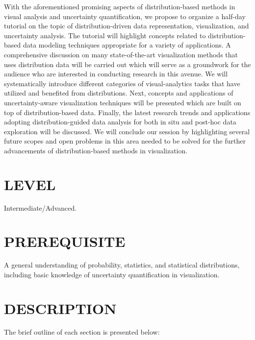 \documentclass[preprint,journal]{vgtc}       %
\newcommand{\addverticalspace}{\vspace{3mm}}
\begin{document}
With the aforementioned promising aspects of distribution-based methods in visual analysis and uncertainty quantification, we propose to organize a half-day tutorial on the topic of distribution-driven data representation, visualization, and uncertainty analysis. The tutorial will highlight concepts related to distribution-based data modeling techniques appropriate for a variety of applications. A comprehensive discussion on many state-of-the-art visualization methods that uses distribution data will be carried out which will serve as a groundwork for the audience who are interested in conducting research in this avenue. We will systematically introduce different categories of visual-analytics tasks that have utilized and benefited from distributions. Next, concepts and applications of uncertainty-aware visualization techniques will be presented which are built on top of distribution-based data. Finally, the latest research trends and applications adopting distribution-guided data analysis for both in situ and post-hoc data exploration will be discussed. We will conclude our session by highlighting several future scopes and open problems in this area needed to be solved for the further advancements of distribution-based methods in visualization.

\section*{LEVEL}
Intermediate/Advanced.

\section*{PREREQUISITE}
A general understanding of probability, statistics, and statistical distributions, including basic knowledge of uncertainty quantification in visualization.


\section*{DESCRIPTION}
The brief outline of each section is presented below:

\addverticalspace
\end{document}
